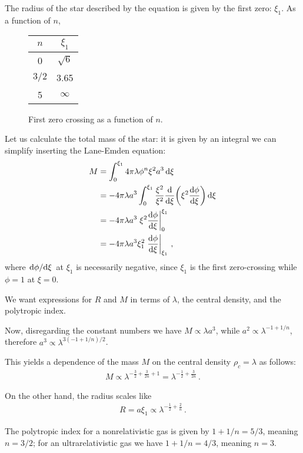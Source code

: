\documentclass[main.tex]{subfiles}
\begin{document}
The radius of the star described by the equation is given by the first zero: \(\xi_1 \). 
As a function of \(n\), 

\begin{figure}
\centering
\begin{tabular}{cc}
\(n\) & \(\xi_1\)\\
\hline
0 & \(\sqrt{6}\)  \\
\(3/2\) & \num{3.65}  \\
5 & \(\infty \)
\end{tabular}
\label{tab:zero-crossing-lane-emden}
\caption{First zero crossing as a function of \(n\).}
\end{figure}

Let us calculate the total mass of the star: it is given by an integral we can simplify inserting the Lane-Emden equation:
%
\begin{align}
M &= \int_{0}^{\xi_1 } 4 \pi \lambda \phi^{n} \xi^2 a^3 \dd{\xi }  \\
&= -4 \pi \lambda a^3 \int_{0}^{\xi_1 } \frac{\xi^2}{\xi^2} \dv{}{\xi } \qty( \xi^2 \dv{\phi }{\xi }) \dd{\xi }  \\
&= - 4 \pi \lambda a^3 \eval{\xi^2 \dv{\phi }{\xi }}_{0}^{\xi_1 }  \\
&= - 4 \pi \lambda a^3 \xi_1^2 \eval{\dv{\phi }{\xi }}_{\xi_1 }
\,,
\end{align}
%
where \(\dv*{\phi }{\xi}\) at \(\xi_1 \) is necessarily negative, since \(\xi_1\) is the first zero-crossing while \(\phi = 1\) at \(\xi= 0\). 

We want expressions for \(R\) and \(M\) in terms of \(\lambda \), the central density, and the polytropic index. 

Now, disregarding the constant numbers we have \(M \propto \lambda a^3\), while \(a^2 \propto \lambda^{-1 + 1/n}\), therefore \(a^3 \propto \lambda^{3 (-1 + 1/n) /2}\). 

This yields a dependence of the mass \(M\) on the central density \(\rho _c = \lambda \) as follows: 
%
\begin{align}
M \propto \lambda^{- \frac{3}{2} + \frac{3}{2n} + 1} = \lambda^{- \frac{1}{2} + \frac{3}{2n}}
\,.
\end{align}

On the other hand, the radius scales like 
%
\begin{align}
R = a \xi_1 \propto \lambda^{- \frac{1}{2} + \frac{2}{n}}
\,.
\end{align}

The polytropic index for a nonrelativistic gas is given by \(1 + 1/n = 5/3\), meaning \(n = 3/2\); for an ultrarelativistic gas we have \(1 + 1/n = 4/3\), meaning \(n = 3\). 
\end{document}
